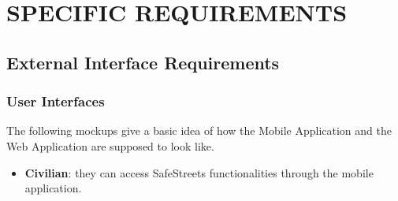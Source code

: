 \documentclass[12pt,a4paper]{article}
\begin{document}
\section{SPECIFIC REQUIREMENTS}
\subsection{External Interface Requirements} 
\subsubsection{User Interfaces}
The following mockups give a basic idea of how the Mobile Application and the Web Application are supposed to look like.
\begin {itemize}
	\item \textbf{Civilian}: they can access SafeStreets functionalities through the mobile application.					
		\begin{figure}[H]
			\centering
			\quad
			\quad

\end{figure}
\end{itemize}
\end{document}
